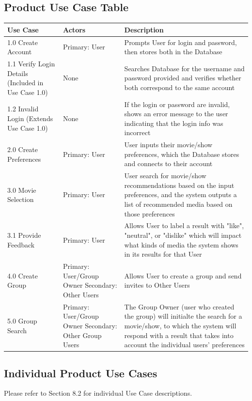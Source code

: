 \documentclass[12pt]{article}
\begin{document}
\subsection{Product Use Case Table}
\begin{tabularx}{\textwidth}{|p{4cm}p{6cm}X|}
	\toprule {\bf Use Case} & {\bf Actors} & {\bf Description}\\
	\hline
	1.0 Create Account & Primary: User & Prompts User for login and password, then stores both in the Database \\
	\hline
	1.1 Verify Login Details \newline (Included in Use Case 1.0) & None & Searches Database for the username and password provided and verifies whether both correspond to the same account \\
	\hline
	1.2 Invalid Login \newline (Extends Use Case 1.0) & None & If the login or password are invalid, shows an error message to the user indicating that the login info was incorrect \\
	\hline
	2.0 Create Preferences & Primary: User & User inputs their movie/show preferences, which the Database stores and connects to their account \\
	\hline
	3.0 Movie Selection & Primary: User & User search for movie/show recommendations based on the input preferences, and the system outputs a list of recommended media based on those preferences \\
	\hline
	3.1 Provide Feedback & Primary: User & Allows User to label a result with "like", "neutral", or "dislike" which will impact what kinds of media the system shows in its results for that User \\
	\hline
	4.0 Create Group & Primary: User/Group Owner \newline Secondary: Other Users & Allows User to create a group and send invites to Other Users \\
	\hline
	5.0 Group Search & Primary: User/Group Owner \newline Secondary: Other Group Users & The Group Owner (user who created the group) will initialte the search for a movie/show, to which the system will respond with a result that takes into account the individual users' preferences \\
	\hline
	\end{tabularx}

\subsection{Individual Product Use Cases}
Please refer to Section 8.2 for individual Use Case descriptions.
\end{document}
